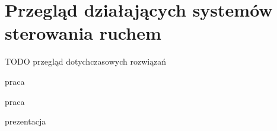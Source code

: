 \chapter{Przegląd działających systemów sterowania ruchem}
TODO przegląd dotychczasowych rozwiązań

praca \cite{zakrzewski}

praca \cite{jamroz+oskarbski}

prezentacja \cite{pluta-zaremba+cichosz+nowicka}